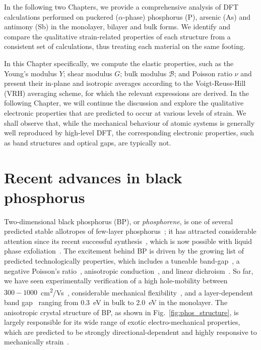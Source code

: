 In the following two Chapters, 
we provide a comprehensive analysis of 
DFT calculations performed on puckered ($\alpha$-phase) 
phosphorus (P), arsenic (As) and antimony (Sb) 
in the monolayer, bilayer and bulk forms.
%  
We identify and compare the qualitative 
strain-related properties of each structure 
from a consistent set of calculations, 
thus treating each material on the same footing.

In this Chapter specifically, 
we compute the elastic properties, 
such as the Young's modulus $Y$; 
shear modulus $G$; 
bulk modulus $\mathcal{B}$; 
and Poisson ratio $\nu$ 
and present their in-plane and isotropic averages 
according to the Voigt-Reuss-Hill (VRH) averaging scheme, 
for which the relevant expressions are derived.
%
In the following Chapter, 
we will continue the discussion and 
explore the qualitative electronic properties 
that are predicted to occur at various 
levels of strain.
%
We shall observe that, 
while the mechanical behaviour 
of atomic systems is generally 
well reproduced by high-level DFT, 
the corresponding electronic properties, 
such as band structures and 
optical gaps, are typically not.
 

\section{Recent advances in black phosphorus}
\label{sec:recent_advances}
%
Two-dimensional black phosphorus (BP), 
or {\it phosphorene}, 
is one of several predicted stable allotropes of 
few-layer phosphorus~\cite{doi:10.1021/acs.nanolett.5b01041,PhysRevLett.113.046804,PhysRevLett.112.176802,doi:10.1021/nn5059248}; 
it has attracted considerable attention since its recent 
successful synthesis~\cite{Li2014,Xia2014,doi:10.1063/1.4868132,doi:10.1021/nn501226z,Ling14042015}, 
which is now possible with liquid phase exfoliation~\cite{C4CC05752J,PMID:26469634}.
%
The excitement behind BP 
is driven by the growing list of 
predicted technologically properties, 
which includes
a tuneable band-gap~\cite{PhysRevLett.112.176801,PhysRevB.90.085402,PhysRevB.91.235118,doi:10.1021/jp508618t,PhysRevB.91.115412,0957-4484-25-45-455703,doi:10.1021/nn501226z}, 
a negative Poisson's ratio~\cite{Jiang2014}, 
anisotropic conduction~\cite{doi:10.1021/nl500935z,C4CS00257A}, 
and linear dichroism~\cite{Qiao2014,PhysRevB.89.235319}.
%  
So far, we have seen experimentally verification of  
a high hole-mobility 
between $300-1000$~cm\textsuperscript{2}/Vs~\cite{doi:10.1021/nn501226z,PhysRev.92.580,doi:10.1063/1.4868132,Qiao2014}, 
considerable mechanical flexibility~\cite{doi:10.1063/1.4885215}, 
and a layer-dependent band gap~\cite{9909120720141024,PhysRevB.89.235319,Zant2014} ranging from 0.3~eV in bulk to 2.0~eV in the monolayer.
%
The anisotropic crystal structure of BP, 
as shown in Fig.~\ref{fig:phos_structure},
is largely responsible for its 
wide range of exotic
electro-mechanical properties, 
which are predicted to be strongly directional-dependent 
and highly responsive to 
mechanically strain~\cite{doi:10.1021/nl500935z,PMID:26469634}. 

